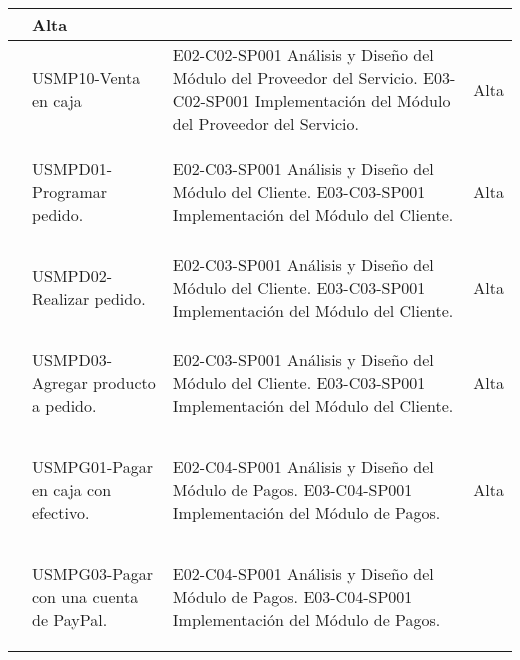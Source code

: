 \begin{center}
\begin{longtable}{|p{}|p{}|p{}|p{}|}
											 & Alta\\
\hline
	\getElementById[Requerimiento]{REQMP15} & \begin{Titemize}
												\Titem USMP10-Venta en caja
											  \end{Titemize} &\Titem E02-C02-SP001 Análisis y Diseño del Módulo del Proveedor del Servicio. \Titem E03-C02-SP001 Implementación del Módulo del Proveedor del Servicio.& Alta\\
\hline
	\getElementById[Requerimiento]{REQMPD01} & \begin{Titemize}
													\Titem USMPD01-Programar pedido.
											   \end{Titemize} & 
											   \Titem E02-C03-SP001 Análisis y Diseño del Módulo del Cliente.
											   \Titem E03-C03-SP001 Implementación del Módulo del Cliente.
											   & Alta\\
\hline
	\getElementById[Requerimiento]{REQMPD02} & \begin{Titemize}
													\Titem USMPD02-Realizar pedido.
											   \end{Titemize} & 
											   \Titem E02-C03-SP001 Análisis y Diseño del Módulo del Cliente.
											   \Titem E03-C03-SP001 Implementación del Módulo del Cliente.
											   & Alta\\
\hline
	\getElementById[Requerimiento]{REQMPD03} & \begin{Titemize}
													\Titem USMPD03-Agregar producto a pedido.
												\end{Titemize} &
												\Titem E02-C03-SP001 Análisis y Diseño del Módulo del Cliente.
												\Titem E03-C03-SP001 Implementación del Módulo del Cliente.
												 & Alta\\
\hline
	\getElementById[Requerimiento]{REQMPG01} & \begin{Titemize}
													\Titem USMPG01-Pagar en caja con efectivo.
											    \end{Titemize} &
											    \Titem E02-C04-SP001 Análisis y Diseño del Módulo de Pagos.
											    \Titem E03-C04-SP001 Implementación del Módulo de Pagos.
											     & Alta\\
\hline
	\getElementById[Requerimiento]{REQMPG03} & \begin{Titemize}
													\Titem USMPG03-Pagar con una cuenta de PayPal.
											   \end{Titemize} & 
											   \Titem E02-C04-SP001 Análisis y Diseño del Módulo de Pagos.
											   \Titem E03-C04-SP001 Implementación del Módulo de Pagos.

\end{longtable}
\end{center}
